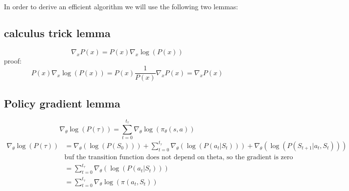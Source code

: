 \documentclass{article}
\theoremstyle{plain}
\theoremstyle{definition}
\theoremstyle{remark}
\begin{document}
	In order to derive an efficient algorithm we will use the following two lemmas:
	
	\subsection{calculus trick lemma}
	$$\nabla_x P(x) = P(x) \nabla_x \log(P(x))$$
	proof:
	$$P(x) \nabla_x \log(P(x)) = P(x) \frac{1}{P(x)}\nabla_x P(x) = \nabla_x P(x)$$
	\subsection{Policy gradient lemma}
	$$\nabla_\theta \log(P(\tau)) = \sum_{t=0}^{t_\tau} \nabla_\theta \log(\pi_\theta(s,a))$$
	$$
	\begin{aligned}
	\nabla_\theta \log(P(\tau)) &= \nabla_\theta(\log(P(S_0))) + \sum_{t=0}^{t_\tau} \nabla_\theta(\log(P(a_t|S_t))) + \nabla_\theta(\log(P(S_{t+1}|a_t,S_t))) \\
	& \text{buf the transition function does not depend on theta, so the gradient is zero}\\
	&=  \sum_{t=0}^{t_\tau} \nabla_\theta(\log(P(a_t|S_t))) \\
	&=  \sum_{t=0}^{t_\tau} \nabla_\theta \log(\pi(a_t,S_t)) \\
	\end{aligned}$$
	
\end{document}
